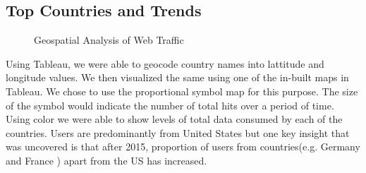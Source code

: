 \subsection{Top Countries and Trends} \label{vizcountries}
 

\begin{figure}
\centering
{}
\caption{Geospatial Analysis of Web Traffic}
\label{fig:TopCountries}
\end{figure}

Using Tableau, we were able to geocode country names into lattitude and longitude values. We then visualized the same using one of the in-built maps in Tableau. We chose to use the proportional symbol map for this purpose. The size of the symbol would indicate the number of total hits over a period of time. Using color we were able to show levels of total data consumed by each of the countries. Users are predominantly from United States but one key insight that was uncovered is that after 2015, proportion of users from countries(e.g. Germany and France ) apart from the US has increased. 
